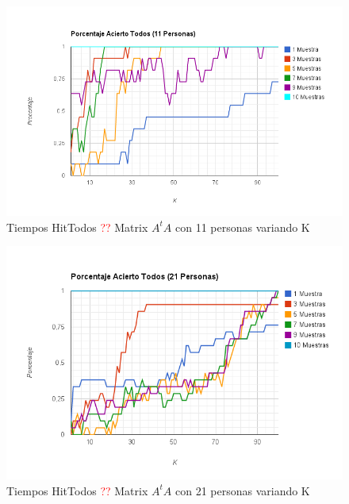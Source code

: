 \begin{figure}[H]
\includegraphics[width=1\textwidth]{img/imagej.png}
     \caption{Tiempos HitTodos \textcolor{red}{??} Matrix $A^tA$ con 11 personas variando K}
     \label{fig:figura1}
\end{figure}

\begin{figure}[H]
\includegraphics[width=1\textwidth]{img/imagek.png}
     \caption{Tiempos HitTodos \textcolor{red}{??} Matrix $A^tA$ con 21 personas variando K}
     \label{fig:figura1}
\end{figure}

